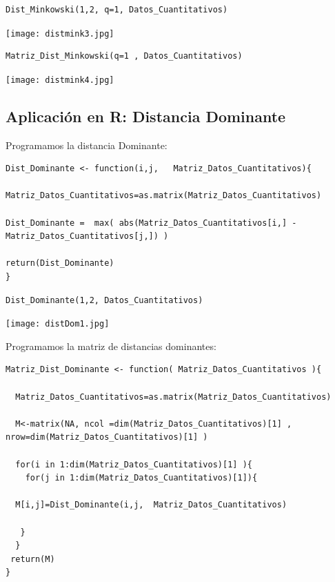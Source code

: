 \documentclass[12pt]{report} %
\begin{document}
\begin{lstlisting}
Dist_Minkowski(1,2, q=1, Datos_Cuantitativos)
\end{lstlisting}

\texttt{[image: distmink3.jpg]}


\begin{lstlisting}
Matriz_Dist_Minkowski(q=1 , Datos_Cuantitativos) 
\end{lstlisting}

\texttt{[image: distmink4.jpg]}

\newpage


\subsection{Aplicación en R: Distancia Dominante}

Programamos la  distancia  Dominante:

\begin{lstlisting}
Dist_Dominante <- function(i,j,   Matriz_Datos_Cuantitativos){
  
Matriz_Datos_Cuantitativos=as.matrix(Matriz_Datos_Cuantitativos)  

Dist_Dominante =  max( abs(Matriz_Datos_Cuantitativos[i,] - Matriz_Datos_Cuantitativos[j,]) )
  
return(Dist_Dominante)
}

\end{lstlisting}


\begin{lstlisting}
Dist_Dominante(1,2, Datos_Cuantitativos)
\end{lstlisting}


\texttt{[image: distDom1.jpg]}

Programamos la matriz de distancias dominantes:

\begin{lstlisting}
Matriz_Dist_Dominante <- function( Matriz_Datos_Cuantitativos ){
  
  Matriz_Datos_Cuantitativos=as.matrix(Matriz_Datos_Cuantitativos)
  
  M<-matrix(NA, ncol =dim(Matriz_Datos_Cuantitativos)[1] , nrow=dim(Matriz_Datos_Cuantitativos)[1] )
  
  for(i in 1:dim(Matriz_Datos_Cuantitativos)[1] ){
    for(j in 1:dim(Matriz_Datos_Cuantitativos)[1]){
    
  M[i,j]=Dist_Dominante(i,j,  Matriz_Datos_Cuantitativos)
  
   }
  }
 return(M)
}
\end{lstlisting}
\end{document}
